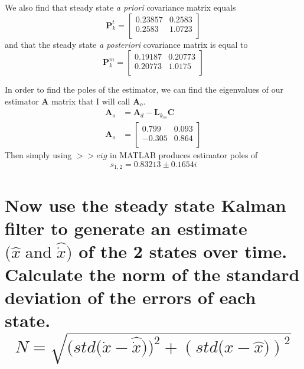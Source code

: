 \documentclass[12pt,letterpaper, onecolumn]{exam}
\begin{document}
\begin{questions}
\begin{parts}
{        We also find that steady state \textit{a priori} covariance matrix equals
        \[ \mathbf{P}^t_k =
            \begin{bmatrix}
                0.23857 & 0.2583 \\
                0.2583  & 1.0723 \\
            \end{bmatrix} \]
        and that the steady state \textit{a posteriori} covariance matrix is equal to
        \[ \mathbf{P}^m_k =
            \begin{bmatrix}
                0.19187 & 0.20773 \\
                0.20773 & 1.0175  \\
            \end{bmatrix} \]

        In order to find the poles of the estimator, we can find the eigenvalues of our estimator $\mathbf{A}$ matrix that I will call $\mathbf{A}_o$.
        \begin{equation}
            \begin{split}
                \mathbf{A}_o & = \mathbf{A}_d - \mathbf{L}_{k_{ss}}\mathbf{C}\\
                \mathbf{A}_o & =
                \begin{bmatrix}
                    0.799  & 0.093 \\
                    -0.305 & 0.864 \\
                \end{bmatrix}
            \end{split}
            \label{eq:7}
        \end{equation}
        Then simply using $>>eig$ in MATLAB produces estimator poles of
        \[s_{1,2} = 0.83213 \pm 0.1654i \]
        }
        \clearpage
        \part{Now use the steady state Kalman filter to generate an estimate $\big(\hat{x}\;\text{and}\;\hat{\dot{x}}\big)$ of the 2 states over time. Calculate the norm of the standard deviation of the errors of each state. \[N = \sqrt{\big(std\big(\dot{x} - \hat{\dot{x}}\big)\big)^2 + \left(std\big(x - \hat{x}\big)\right)^2} \]}


\end{parts}
\end{questions}
\end{document}
